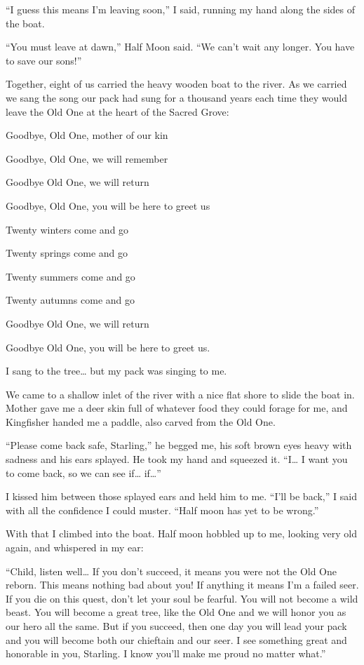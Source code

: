 ``I guess this means I'm leaving soon,'' I said, running my hand along the sides of the boat.

``You must leave at dawn,'' Half Moon said. ``We can't wait any longer. You have to save our sons!''

\secdiv

Together, eight of us carried the heavy wooden boat to the river. As we carried we sang the song our pack had sung for a thousand years each time they would leave the Old One at the heart of the Sacred Grove:

Goodbye, Old One, mother of our kin

Goodbye, Old One, we will remember

Goodbye Old One, we will return

Goodbye, Old One, you will be here to greet us

Twenty winters come and go

Twenty springs come and go

Twenty summers come and go

Twenty autumns come and go

Goodbye Old One, we will return

Goodbye Old One, you will be here to greet us.

I sang to the tree\ldots{} but my pack was singing to me.

We came to a shallow inlet of the river with a nice flat shore to slide the boat in. Mother gave me a deer skin full of whatever food they could forage for me, and Kingfisher handed me a paddle, also carved from the Old One.

``Please come back safe, Starling,'' he begged me, his soft brown eyes heavy with sadness and his ears splayed. He took my hand and squeezed it. ``I\ldots{} I want you to come back, so we can see if\ldots{} if\ldots''

I kissed him between those splayed ears and held him to me. ``I'll be back,'' I said with all the confidence I could muster. ``Half moon has yet to be wrong.''

With that I climbed into the boat. Half moon hobbled up to me, looking very old again, and whispered in my ear:

``Child, listen well\ldots{} If you don't succeed, it means you were not the Old One reborn. This means nothing bad about you! If anything it means I'm a failed seer. If you die on this quest, don't let your soul be fearful. You will not become a wild beast. You will become a great tree, like the Old One and we will honor you as our hero all the same. But if you succeed, then one day you will lead your pack and you will become both our chieftain and our seer. I see something great and honorable in you, Starling. I know you'll make me proud no matter what.''

